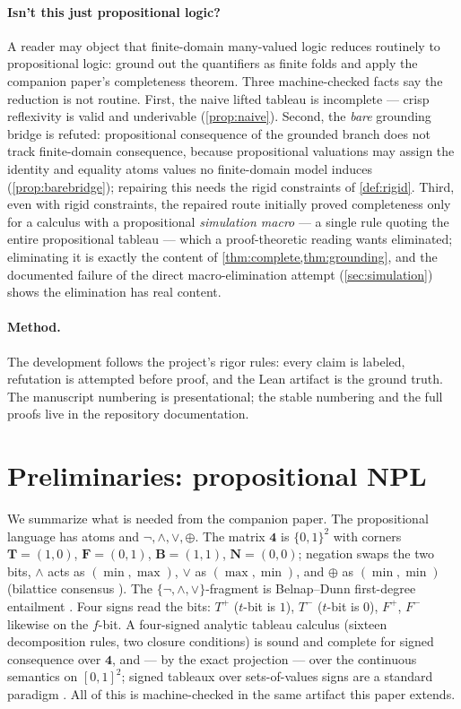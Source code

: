 \documentclass[11pt,a4paper]{article}
\theoremstyle{definition}
\newcommand{\FOUR}{\mathbf{4}}
\newcommand{\vT}{\mathbf{T}}
\newcommand{\vF}{\mathbf{F}}
\newcommand{\vB}{\mathbf{B}}
\newcommand{\vN}{\mathbf{N}}
\newcommand{\hmz}{\oplus}
\newcommand{\Tp}{T^{+}}\newcommand{\Tm}{T^{-}}
\newcommand{\Fp}{F^{+}}\newcommand{\Fm}{F^{-}}
\begin{document}
\paragraph{Isn't this just propositional logic?} A reader may object that
finite-domain many-valued logic reduces routinely to propositional logic:
ground out the quantifiers as finite folds and apply the companion paper's
completeness theorem. Three machine-checked facts say the reduction is not
routine. First, the naive lifted tableau is incomplete — crisp reflexivity
is valid and underivable (\cref{prop:naive}). Second, the \emph{bare}
grounding bridge is refuted: propositional consequence of the grounded
branch does not track finite-domain consequence, because propositional
valuations may assign the identity and equality atoms values no
finite-domain model induces (\cref{prop:barebridge}); repairing this needs
the rigid constraints of \cref{def:rigid}. Third, even with rigid
constraints, the repaired route initially proved completeness only for a
calculus with a propositional \emph{simulation macro} — a single rule
quoting the entire propositional tableau — which a proof-theoretic reading
wants eliminated; eliminating it is exactly the content of
\cref{thm:complete,thm:grounding}, and the documented failure of the
direct macro-elimination attempt (\cref{sec:simulation}) shows the
elimination has real content.

\paragraph{Method.} The development follows the project's rigor rules:
every claim is labeled, refutation is attempted before proof, and the Lean
artifact is the ground truth. The manuscript numbering is presentational;
the stable numbering and the full proofs live in the repository
documentation.

\section{Preliminaries: propositional NPL}\label{sec:prelim}

We summarize what is needed from the companion paper. The propositional
language has atoms and $\lnot,\wedge,\vee,\hmz$. The matrix $\FOUR$ is
$\{0,1\}^2$ with corners $\vT=(1,0)$, $\vF=(0,1)$, $\vB=(1,1)$,
$\vN=(0,0)$; negation swaps the two bits, $\wedge$ acts as $(\min,\max)$,
$\vee$ as $(\max,\min)$, and $\hmz$ as $(\min,\min)$ (bilattice consensus
\cite{ginsberg1988multivalued,fitting1991bilattices,arieli1996reasoning}).
The $\{\lnot,\wedge,\vee\}$-fragment is Belnap--Dunn first-degree
entailment \cite{belnap1977useful,dunn1976intuitive}. Four signs read the
bits: $\Tp$ ($t$-bit is $1$), $\Tm$ ($t$-bit is $0$), $\Fp$, $\Fm$
likewise on the $f$-bit. A four-signed analytic tableau calculus (sixteen
decomposition rules, two closure conditions) is sound and complete for
signed consequence over $\FOUR$, and — by the exact projection — over the
continuous semantics on $[0,1]^2$; signed tableaux over sets-of-values
signs are a standard paradigm \cite{haehnle1994automated}. All of this is
machine-checked in the same artifact this paper extends.
\end{document}
